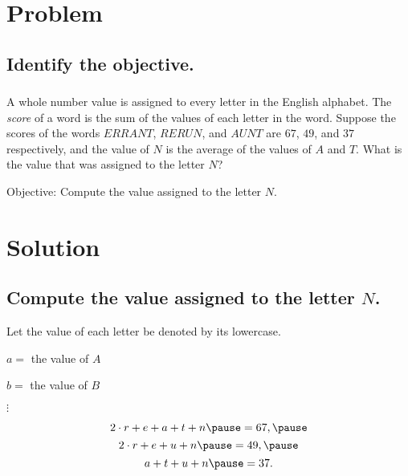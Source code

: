 \documentclass{beamer} %
\begin{document}
\begin{frame} %
  \titlepage
\end{frame}

\section{Problem}

\subsection*{Identify the objective.}

\begin{frame}
  \frametitle{}
  A whole number value is assigned to every letter in the English alphabet. The \textit{score} of a word is the sum of the values of each letter in the word. Suppose the scores of the words $ERRANT$, $RERUN$, and $AUNT$ are $67$, $49$, and $37$ respectively, and the value of $N$ is the average of the values of $A$ and $T$. What is the value that was assigned to the letter $N$?\pause
  \begin{center}
    Objective: Compute the value assigned to the letter $N$.
  \end{center}
\end{frame}

\section{Solution}

\subsection*{Compute the value assigned to the letter $N$.}

\begin{frame}
  \begin{center}
    Let the value of each letter be denoted by its lowercase.\pause
    
    $a = $ the value of $A$\pause
    
    $b = $ the value of $B$\pause
    
    $\vdots$\pause
  \end{center}

  \begin{equation*}
    2\cdot r+e+a+t+n\pause=67,\pause
  \end{equation*}
  \begin{equation*}
    2\cdot r+e+u+n\pause=49,\pause
  \end{equation*}
  \begin{equation*}
    a+t+u+n\pause=37.
  \end{equation*}
\end{frame}
\end{document}
